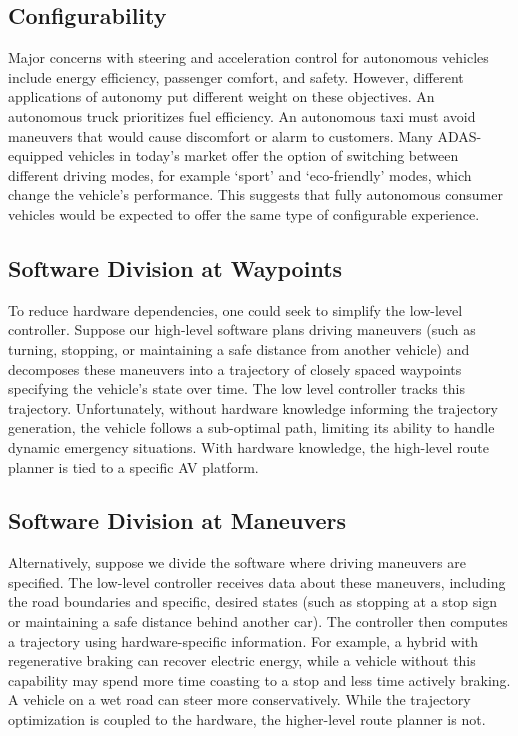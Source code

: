 \documentclass[letterpaper, 10 pt, conference]{ieeeconf}  %
\begin{document}
\subsection{Configurability}
Major concerns with steering and acceleration control for autonomous vehicles include energy efficiency, passenger comfort, and safety. However, different applications of autonomy put different weight on these objectives. An autonomous truck prioritizes fuel efficiency. An autonomous taxi must avoid maneuvers that would cause discomfort or alarm to customers. Many ADAS-equipped vehicles in today's market offer the option of switching between different driving modes, for example `sport' and `eco-friendly' modes, which change the vehicle's performance. This suggests that fully autonomous consumer vehicles would be expected to offer the same type of configurable experience.


\subsection{Software Division at Waypoints}

To reduce hardware dependencies, one could seek to simplify the low-level controller. Suppose our high-level software plans driving maneuvers (such as turning, stopping, or maintaining a safe distance from another vehicle) and decomposes these maneuvers into a trajectory of closely spaced waypoints specifying the vehicle's state over time. The low level controller tracks this trajectory. Unfortunately, without hardware knowledge informing the trajectory generation, the vehicle follows a sub-optimal path, limiting its ability to handle dynamic emergency situations. With hardware knowledge, the high-level route planner is tied to a specific AV platform.

\subsection{Software Division at Maneuvers} Alternatively, suppose we divide the software where driving maneuvers are specified. The low-level controller receives data about these maneuvers, including the road boundaries and specific, desired states (such as stopping at a stop sign or maintaining a safe distance behind another car). The controller then computes a trajectory using hardware-specific information. For example, a hybrid with regenerative braking can recover electric energy, while a vehicle without this capability may spend more time coasting to a stop and less time actively braking. A vehicle on a wet road can steer more conservatively. While the trajectory optimization is coupled to the hardware, the higher-level route planner is not.
\end{document}
